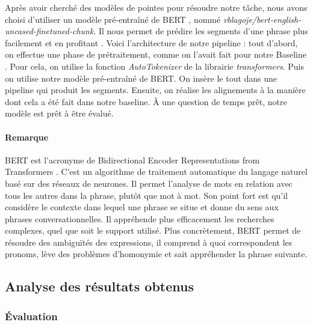 \documentclass[a4paper, twoside, 11pt]{article}
\begin{document}
 Après avoir cherché des modèles de pointes pour résoudre notre tâche, nous avons choisi d’utiliser un modèle pré-entraîné de \og BERT \fg{}, nommé \textit{vblagoje/bert-english-uncased-finetuned-chunk}. Il nous permet de prédire les segments d’une phrase plus facilement et en profitant . Voici l’architecture de notre pipeline : tout d’abord, on effectue une phase de prétraitement, comme on l'avait fait pour notre \og Baseline \fg{}. Pour cela, on utilise la fonction \textit{AutoTokenizer} de la librairie \textit{transformers}. Puis on utilise notre modèle pré-entraîné de BERT. On insère le tout dans une pipeline qui produit les segments. Ensuite, on réalise les alignements à la manière dont cela a été fait dans notre baseline. À une question de temps prêt, notre modèle est prêt à être évalué.
\paragraph{Remarque}
 BERT est l’acronyme de \og Bidirectional Encoder Representations from Transformers \fg{}. C’est un algorithme de traitement automatique du langage naturel basé sur des réseaux de neurones. Il permet l’analyse de mots en relation avec tous les autres dans la phrase, plutôt que mot à mot. Son point fort est qu’il considère le contexte dans lequel une phrase se situe et donne du sens aux phrases conversationnelles. Il appréhende plus efficacement les recherches complexes, quel que soit le support utilisé. Plus concrètement, BERT permet de résoudre des ambiguïtés des expressions, il comprend à quoi correspondent les pronoms, lève des problèmes d’homonymie et sait appréhender la phrase suivante.

 \subsection{Analyse des résultats obtenus}
 \subsubsection{Évaluation}
\end{document}
